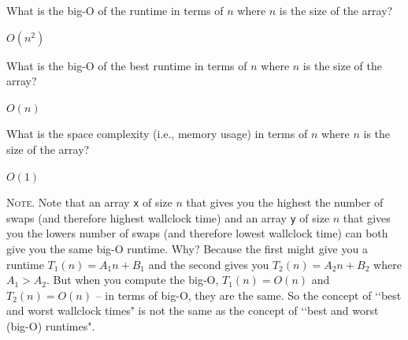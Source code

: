\nextq
What is the big-O of the runtime
in terms of $n$ where $n$ is the size of the array?
\\
\ANSWER
\begin{answerlong}
$O(n^2)$
\end{answerlong}

\nextq
What is the big-O of the best runtime
in terms of $n$ where $n$ is the size of the array?
\\
\ANSWER
\begin{answerlong}
$O(n)$
\end{answerlong}

\nextq
What is the space complexity (i.e., memory usage)
in terms of $n$ where $n$ is the size of the array?
\\
\ANSWER
\begin{answerlong}
$O(1)$
\end{answerlong}

\textsc{Note.}
Note that an array \verb!x! of size $n$ that gives you the highest
the number of swaps (and therefore highest wallclock time)
and an array \verb!y! of size $n$ that gives you the lowers number of
swaps (and therefore lowest wallclock time)
can both give you the same big-O runtime.
Why? Because the first might give you a runtime $T_1(n) = A_1n + B_1$
and the second gives you $T_2(n) = A_2n + B_2$
where $A_1 > A_2$.
But when you compute the big-O, $T_1(n) = O(n)$ and $T_2(n) = O(n)$ --
in terms of big-O, they are the same.
So the concept of \lq\lq best and worst wallclock times" is not the same as the
concept of \lq\lq best and worst (big-O) runtimes".


